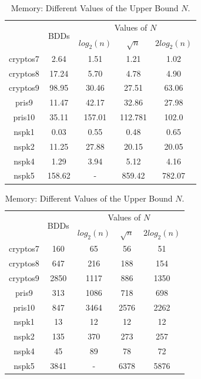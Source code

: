 \documentclass[11pt]{article}
\begin{document}
\begin{table}
\centering
\begin{tabular}{|*{5}{c|}}
\hline
& \multirow{2}{*}{BDDs} & \multicolumn{3}{c|}{Values of $N$}  \\ \cline{3-5}
&  & $log_2(n)$ & $\sqrt{n}$ & $2log_2(n)$  \\ \hline
cryptos7 & 2.64 &1.51 & 1.21 & 1.02 \\ \hline
cryptos8 & 17.24 & 5.70 & 4.78 & 4.90 \\ \hline
cryptos9 & 98.95 & 30.46& 27.51  & 63.06 \\ \hline
pris9 & 11.47 & 42.17 & 32.86 & 27.98  \\ \hline
pris10 & 35.11 & 157.01 & 112.781  & 102.0 \\ \hline
nspk1 & 0.03 & 0.55 & 0.48& 0.65 \\ \hline
nspk2 & 11.25 & 27.88 &20.15 & 20.05 \\ \hline
nspk4 & 1.29 & 3.94 & 5.12 & 4.16 \\ \hline
nspk5 & 158.62 & -& 859.42& 782.07 \\ \hline
\end{tabular}
\caption{Time Comparisons With Different Values of the Upper Bound $N$. In the table, $n$ denotes the total number of variables in the model.}
\label{table:upperboundvaluestime}
\vspace{1in}
\centering
\begin{tabular}{|*{5}{c|}}
\hline
 & \multirow{2}{*}{BDDs} & \multicolumn{3}{c|}{Values of $N$}  \\ \cline{3-5}
 & & $log_2(n)$ & $\sqrt{n}$ & $2log_2(n)$  \\ \hline
cryptos7 & 160 & 65 & 56  & 51 \\ \hline
cryptos8 & 647 & 216 & 188 & 154 \\ \hline
cryptos9 &2850& 1117 & 886  & 1350\\ \hline
pris9 & 313 &1086 & 718  & 698\\ \hline
pris10 & 847& 3464 & 2576 & 2262\\ \hline
nspk1 & 13 & 12 & 12  &  12\\ \hline
nspk2 & 135 & 370 & 273  & 257\\ \hline
nspk4 & 45 & 89&78  & 72 \\ \hline
nspk5 & 3841 & - & 6378 & 5876  \\ \hline
\end{tabular}
\caption{Memory: Different Values of the Upper Bound $N$. }
\label{table:upperboundvaluesmemory}
\end{table}
\end{document}
